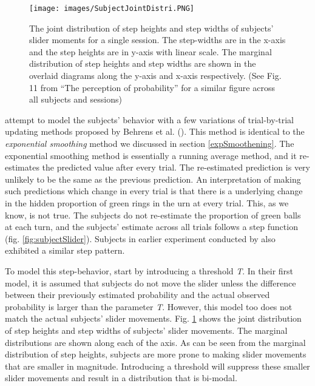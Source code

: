 \documentclass{article}
\begin{document}
\begin{figure}
	\texttt{[image: images/SubjectJointDistri.PNG]}
	\caption{The joint distribution of step heights and step widths of subjects' slider moments for a single session. The step-widths are in the x-axis and the step heights are in y-axis with linear scale. The marginal distribution of step heights and step widths are shown in the overlaid diagrams along the y-axis and x-axis respectively. (See Fig. 11 from ``The perception of probability'' for a similar figure across all subjects and sessions)}
	\label{fig:SubjectJointDistribution}
\end{figure} 

\cite{gallistel2014perception} attempt to model the subjects' behavior with a few variations of trial-by-trial updating methods proposed by Behrens et al. (\cite{behrens2007LearningRate}). This method is identical to the \textit{exponential smoothing} method we discussed in section \ref{expSmoothening}. The exponential smoothing method is essentially a running average method, and it re-estimates the predicted value after every trial. The re-estimated prediction is very unlikely to be the same as the previous prediction. An interpretation of making such predictions which change in every trial is that there is a underlying change in the hidden proportion of green rings in the urn at every trial. This, as we know, is not true. The subjects do not re-estimate the proportion of green balls at each turn, and the subjects' estimate across all trials follows a step function (fig. \ref{fig:subjectSlider}). Subjects in earlier experiment conducted by \cite{robinson1964continuous} also exhibited a similar step pattern.

To model this step-behavior, \cite{gallistel2014perception} start by introducing a threshold \textit{T}. In their first model, it is assumed that subjects do not move the slider unless the difference between their previously estimated probability and the actual observed probability is larger than the parameter \textit{T}. However, this model too does not match the actual subjects' slider movements. Fig. \ref{fig:SubjectJointDistribution} shows the joint distribution of step heights and step widths of subjects' slider movements. The marginal distributions are shown along each of the axis. As can be seen from the marginal distribution of step heights, subjects are more prone to making slider movements that are smaller in magnitude. Introducing a threshold will suppress these smaller slider movements and result in a distribution that is bi-modal.
\end{document}
